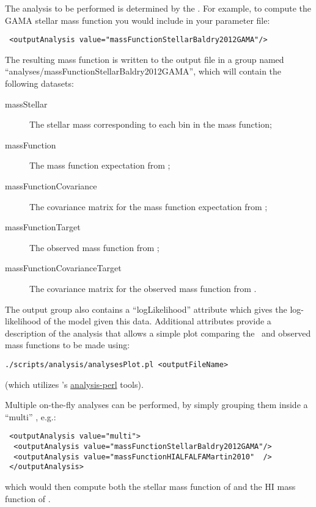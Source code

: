 The analysis to be performed is determined by the . For example, to compute the GAMA stellar mass function \citep{baldry_galaxy_2012} you would include in your parameter file:
\begin{verbatim}
 <outputAnalysis value="massFunctionStellarBaldry2012GAMA"/>
\end{verbatim}
The resulting mass function is written to the output file in a group named ``{\normalfont \ttfamily analyses/massFunctionStellarBaldry2012GAMA}'', which will contain the following datasets:
\begin{description}
\item [{\normalfont \ttfamily massStellar}] The stellar mass corresponding to each bin in the mass function;
\item [{\normalfont \ttfamily massFunction}] The mass function expectation from \glc;
\item [{\normalfont \ttfamily massFunctionCovariance}] The covariance matrix for the mass function expectation from \glc;
\item [{\normalfont \ttfamily massFunctionTarget}] The observed mass function from \cite{baldry_galaxy_2012};
\item [{\normalfont \ttfamily massFunctionCovarianceTarget}] The covariance matrix for the observed mass function from \cite{baldry_galaxy_2012}.
\end{description}
The output group also contains a ``{\normalfont \ttfamily logLikelihood}'' attribute which gives the log-likelihood of the model given this data. Additional attributes provide a description of the analysis that allows a simple plot comparing the \glc\ and observed mass functions to be made using:
\begin{verbatim}
./scripts/analysis/analysesPlot.pl <outputFileName>
\end{verbatim}
(which utilizes \glc's \href{https://github.com/galacticusorg/analysis-perl}{\normalfont \ttfamily analysis-perl} tools).

Multiple on-the-fly analyses can be performed, by simply grouping them inside a ``{\normalfont \ttfamily multi}'' , e.g.:
\begin{verbatim}
 <outputAnalysis value="multi">
  <outputAnalysis value="massFunctionStellarBaldry2012GAMA"/>
  <outputAnalysis value="massFunctionHIALFALFAMartin2010"  />
 </outputAnalysis>
\end{verbatim}
which would then compute both the stellar mass function of \cite{baldry_galaxy_2012} and the HI mass function of \cite{martin_arecibo_2010}.

